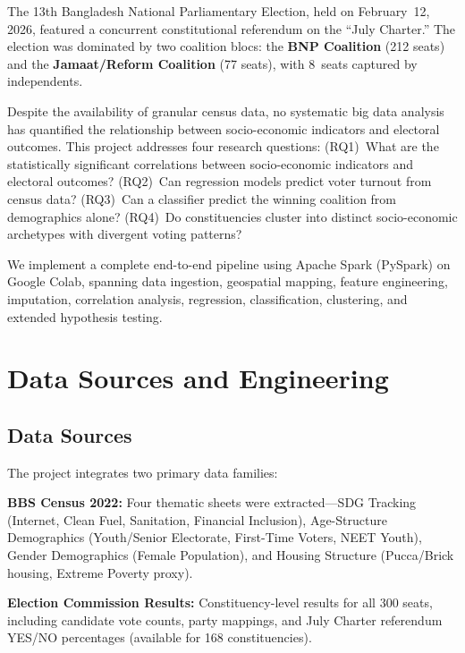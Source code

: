 \documentclass[conference]{IEEEtran}
\begin{document}
The 13th Bangladesh National Parliamentary Election, held on February~12, 2026, featured a concurrent constitutional referendum on the ``July Charter.'' The election was dominated by two coalition blocs: the \textbf{BNP Coalition} (212 seats) and the \textbf{Jamaat/Reform Coalition} (77 seats), with 8~seats captured by independents.

Despite the availability of granular census data, no systematic big data analysis has quantified the relationship between socio-economic indicators and electoral outcomes. This project addresses four research questions: (RQ1)~What are the statistically significant correlations between socio-economic indicators and electoral outcomes? (RQ2)~Can regression models predict voter turnout from census data? (RQ3)~Can a classifier predict the winning coalition from demographics alone? (RQ4)~Do constituencies cluster into distinct socio-economic archetypes with divergent voting patterns?

We implement a complete end-to-end pipeline using Apache Spark (PySpark) on Google Colab, spanning data ingestion, geospatial mapping, feature engineering, imputation, correlation analysis, regression, classification, clustering, and extended hypothesis testing.

\section{Data Sources and Engineering}

\subsection{Data Sources}
The project integrates two primary data families:

\textbf{BBS Census 2022:} Four thematic sheets were extracted---SDG Tracking (Internet, Clean Fuel, Sanitation, Financial Inclusion), Age-Structure Demographics (Youth/Senior Electorate, First-Time Voters, NEET Youth), Gender Demographics (Female Population), and Housing Structure (Pucca/Brick housing, Extreme Poverty proxy).

\textbf{Election Commission Results:} Constituency-level results for all 300 seats, including candidate vote counts, party mappings, and July Charter referendum YES/NO percentages (available for 168 constituencies).
\end{document}
